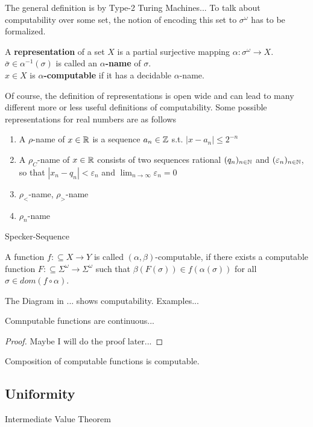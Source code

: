 The general definition is by Type-2 Turing Machines...
To talk about computability over some set, the notion of encoding this set to $\sigma^\omega$ has to be formalized.
\begin{definition}\label{def:representation}
	A \textbf{representation} of a set $X$ is a partial surjective mapping $\alpha: \sigma^\omega \to X$. \\
	$\bar \sigma \in \alpha^{-1}(\sigma)$ is called an \textbf{$\alpha$-name} of $\sigma$. \\
	$x \in X$ is \textbf{$\alpha$-computable} if it has a decidable $\alpha$-name.
\end{definition}

Of course, the definition of representations is open wide and can lead to many different more or less useful definitions of computability.
Some possible representations for real numbers are as follows
\begin{enumerate}
\item A $\rho$-name of $x \in \mathbb R$ is a sequence $a_n \in \mathbb Z$ s.t. $| x - a_n | \leq 2^{-n}$
\item  A $\rho_C$-name of $x \in \mathbb R$ consists of two sequences rational $(q_n)_{n \in \mathbb N}$ and $(\varepsilon_n)_{n \in \mathbb N}$, so that 
$| x_n - q_n | < \varepsilon_n$ and $\lim_{n \to \infty} \varepsilon_n = 0$  
\item $\rho_<$-name, $\rho_>$-name
\item $\rho_n$-name 
\end{enumerate}
\begin{example}
Specker-Sequence
\end{example}
\begin{definition}
	A function $f: \subseteq X \to Y$ is called \textbf{$(\alpha, \beta)$}-computable, 
	if there exists a computable function $F:\subseteq \Sigma^\omega \to \Sigma^\omega$ such that 
	$\beta(F(\sigma)) \in f(\alpha(\sigma))$ for all $\sigma \in dom(f \circ \alpha) $.  
\end{definition}
The Diagram in ... shows computability.
Examples...
\begin{theorem}
	Comnputable functions are continuous...
	\begin{proof}
		Maybe I will do the proof later...
	\end{proof}
\end{theorem}

\begin{theorem}
Composition of computable functions is computable.
\end{theorem}
\subsection{Uniformity}
Intermediate Value Theorem